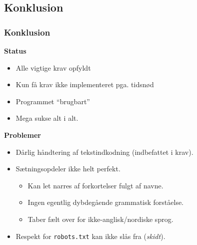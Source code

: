 \documentclass{beamer}
\begin{document}
\subsection{Konklusion}
\begin{frame}
  \frametitle{Konklusion}

  \textbf{Status}

  \begin{itemize}
  \item<1-> Alle vigtige krav opfyldt
  \item<1-> Kun få krav ikke implementeret pga. tidsnød
  \item<2-> Programmet ``brugbart''
  \item<2-> Mega sukse alt i alt.
  \end{itemize}

  \textbf{Problemer}

  \begin{itemize}
  \item<3-> Dårlig håndtering af tekstindkodning (indbefattet i krav).
  \item<4-> Sætningsopdeler ikke helt perfekt.
    \begin{itemize}
    \item<4-> Kan let narres af forkortelser fulgt af navne.
    \item<5-> Ingen egentlig dybdegående grammatisk forståelse.
    \item<6-> Taber fælt over for ikke-anglisk/nordiske sprog.
    \end{itemize}
  \item<7-> Respekt for \texttt{robots.txt} kan ikke slås fra (\textit{skidt}).
  \end{itemize}
  
  \pause
\end{frame}
\end{document}
